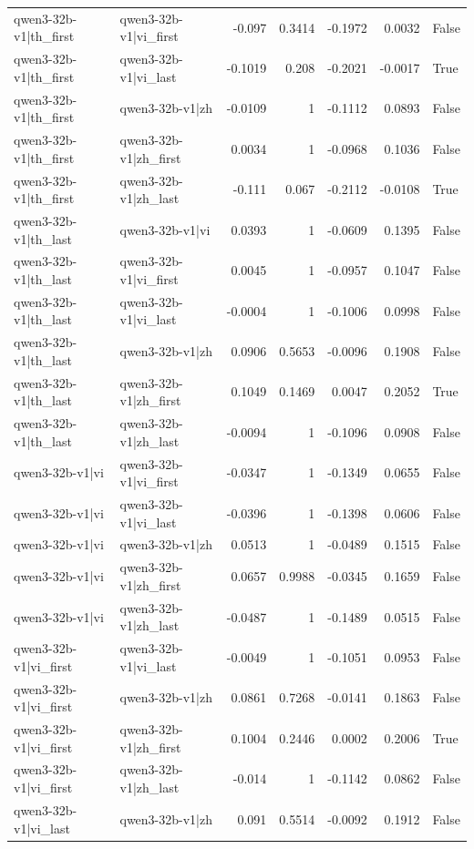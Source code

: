 \begin{table}
\begin{tabular}{l l r r r r l}
qwen3-32b-v1|th_first & qwen3-32b-v1|vi_first & -0.097 & 0.3414 & -0.1972 & 0.0032 & False \\
qwen3-32b-v1|th_first & qwen3-32b-v1|vi_last & -0.1019 & 0.208 & -0.2021 & -0.0017 & True \\
qwen3-32b-v1|th_first & qwen3-32b-v1|zh & -0.0109 & 1 & -0.1112 & 0.0893 & False \\
qwen3-32b-v1|th_first & qwen3-32b-v1|zh_first & 0.0034 & 1 & -0.0968 & 0.1036 & False \\
qwen3-32b-v1|th_first & qwen3-32b-v1|zh_last & -0.111 & 0.067 & -0.2112 & -0.0108 & True \\
qwen3-32b-v1|th_last & qwen3-32b-v1|vi & 0.0393 & 1 & -0.0609 & 0.1395 & False \\
qwen3-32b-v1|th_last & qwen3-32b-v1|vi_first & 0.0045 & 1 & -0.0957 & 0.1047 & False \\
qwen3-32b-v1|th_last & qwen3-32b-v1|vi_last & -0.0004 & 1 & -0.1006 & 0.0998 & False \\
qwen3-32b-v1|th_last & qwen3-32b-v1|zh & 0.0906 & 0.5653 & -0.0096 & 0.1908 & False \\
qwen3-32b-v1|th_last & qwen3-32b-v1|zh_first & 0.1049 & 0.1469 & 0.0047 & 0.2052 & True \\
qwen3-32b-v1|th_last & qwen3-32b-v1|zh_last & -0.0094 & 1 & -0.1096 & 0.0908 & False \\
qwen3-32b-v1|vi & qwen3-32b-v1|vi_first & -0.0347 & 1 & -0.1349 & 0.0655 & False \\
qwen3-32b-v1|vi & qwen3-32b-v1|vi_last & -0.0396 & 1 & -0.1398 & 0.0606 & False \\
qwen3-32b-v1|vi & qwen3-32b-v1|zh & 0.0513 & 1 & -0.0489 & 0.1515 & False \\
qwen3-32b-v1|vi & qwen3-32b-v1|zh_first & 0.0657 & 0.9988 & -0.0345 & 0.1659 & False \\
qwen3-32b-v1|vi & qwen3-32b-v1|zh_last & -0.0487 & 1 & -0.1489 & 0.0515 & False \\
qwen3-32b-v1|vi_first & qwen3-32b-v1|vi_last & -0.0049 & 1 & -0.1051 & 0.0953 & False \\
qwen3-32b-v1|vi_first & qwen3-32b-v1|zh & 0.0861 & 0.7268 & -0.0141 & 0.1863 & False \\
qwen3-32b-v1|vi_first & qwen3-32b-v1|zh_first & 0.1004 & 0.2446 & 0.0002 & 0.2006 & True \\
qwen3-32b-v1|vi_first & qwen3-32b-v1|zh_last & -0.014 & 1 & -0.1142 & 0.0862 & False \\
qwen3-32b-v1|vi_last & qwen3-32b-v1|zh & 0.091 & 0.5514 & -0.0092 & 0.1912 & False \\

\end{tabular}
\end{table}
